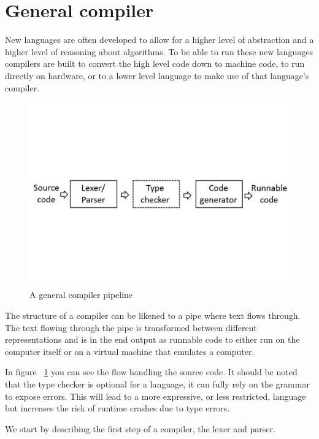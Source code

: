 \section{General compiler}
New languages are often developed to allow for a higher level of abstraction and a higher level of reasoning about algorithms. To be able to run these new languages compilers are built to convert the high level code down to machine code, to run directly on hardware, or to a lower level language to make use of that language's compiler. 

\begin{figure}[h!]
  \centering
  \includegraphics[width=0.6\pdfpagewidth]{figure/generalpipeline2}
  \caption{A general compiler pipeline}
  \label{fig:generalpipeline}
\end{figure}

The structure of a compiler can be likened to a pipe where text flows through. 
The text flowing through the pipe is transformed between different representations and is in
the end output as runnable code to either run on the computer itself or on a virtual machine
that emulates a computer. 

In figure ~\ref{fig:generalpipeline} you can see the flow handling the source code.
It should be noted that the type checker is optional for a language, it can
fully rely on the grammar to expose errors. This will lead to a more expressive, 
or less restricted, language but increases the risk of runtime crashes due to type errors.

We start by describing the first step of a compiler, the lexer and parser.
